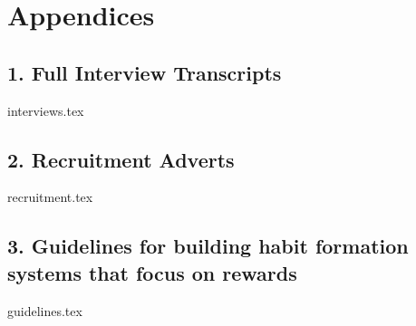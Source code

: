 \cleardoublepage

\section*{Appendices}

\subsection*{1. Full Interview Transcripts} \label{app:transcripts}
{interviews.tex}

\newpage

\subsection*{2. Recruitment Adverts} \label{app:recruitment}
{recruitment.tex}

\newpage
\begin{landscape}
\subsection*{3. Guidelines for building habit formation systems that focus on rewards}  \label{app:guidelines}
  {guidelines.tex}
\end{landscape}

\newpage
